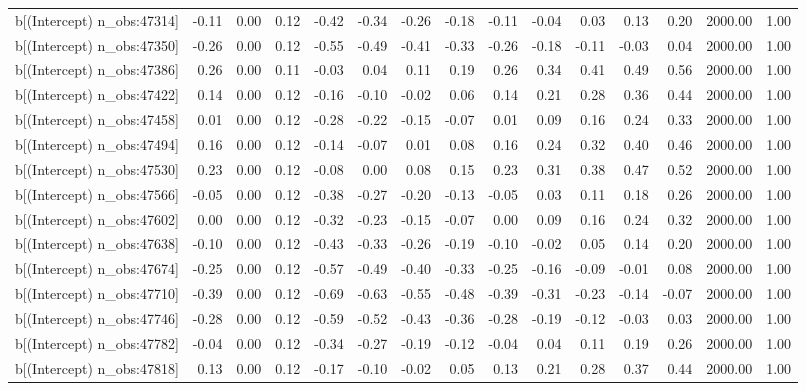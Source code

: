 \begin{table}[ht]
\begin{tabular}{rrrrrrrrrrrrrrr}
  b[(Intercept) n\_obs:47314] & -0.11 & 0.00 & 0.12 & -0.42 & -0.34 & -0.26 & -0.18 & -0.11 & -0.04 & 0.03 & 0.13 & 0.20 & 2000.00 & 1.00 \\ 
  b[(Intercept) n\_obs:47350] & -0.26 & 0.00 & 0.12 & -0.55 & -0.49 & -0.41 & -0.33 & -0.26 & -0.18 & -0.11 & -0.03 & 0.04 & 2000.00 & 1.00 \\ 
  b[(Intercept) n\_obs:47386] & 0.26 & 0.00 & 0.11 & -0.03 & 0.04 & 0.11 & 0.19 & 0.26 & 0.34 & 0.41 & 0.49 & 0.56 & 2000.00 & 1.00 \\ 
  b[(Intercept) n\_obs:47422] & 0.14 & 0.00 & 0.12 & -0.16 & -0.10 & -0.02 & 0.06 & 0.14 & 0.21 & 0.28 & 0.36 & 0.44 & 2000.00 & 1.00 \\ 
  b[(Intercept) n\_obs:47458] & 0.01 & 0.00 & 0.12 & -0.28 & -0.22 & -0.15 & -0.07 & 0.01 & 0.09 & 0.16 & 0.24 & 0.33 & 2000.00 & 1.00 \\ 
  b[(Intercept) n\_obs:47494] & 0.16 & 0.00 & 0.12 & -0.14 & -0.07 & 0.01 & 0.08 & 0.16 & 0.24 & 0.32 & 0.40 & 0.46 & 2000.00 & 1.00 \\ 
  b[(Intercept) n\_obs:47530] & 0.23 & 0.00 & 0.12 & -0.08 & 0.00 & 0.08 & 0.15 & 0.23 & 0.31 & 0.38 & 0.47 & 0.52 & 2000.00 & 1.00 \\ 
  b[(Intercept) n\_obs:47566] & -0.05 & 0.00 & 0.12 & -0.38 & -0.27 & -0.20 & -0.13 & -0.05 & 0.03 & 0.11 & 0.18 & 0.26 & 2000.00 & 1.00 \\ 
  b[(Intercept) n\_obs:47602] & 0.00 & 0.00 & 0.12 & -0.32 & -0.23 & -0.15 & -0.07 & 0.00 & 0.09 & 0.16 & 0.24 & 0.32 & 2000.00 & 1.00 \\ 
  b[(Intercept) n\_obs:47638] & -0.10 & 0.00 & 0.12 & -0.43 & -0.33 & -0.26 & -0.19 & -0.10 & -0.02 & 0.05 & 0.14 & 0.20 & 2000.00 & 1.00 \\ 
  b[(Intercept) n\_obs:47674] & -0.25 & 0.00 & 0.12 & -0.57 & -0.49 & -0.40 & -0.33 & -0.25 & -0.16 & -0.09 & -0.01 & 0.08 & 2000.00 & 1.00 \\ 
  b[(Intercept) n\_obs:47710] & -0.39 & 0.00 & 0.12 & -0.69 & -0.63 & -0.55 & -0.48 & -0.39 & -0.31 & -0.23 & -0.14 & -0.07 & 2000.00 & 1.00 \\ 
  b[(Intercept) n\_obs:47746] & -0.28 & 0.00 & 0.12 & -0.59 & -0.52 & -0.43 & -0.36 & -0.28 & -0.19 & -0.12 & -0.03 & 0.03 & 2000.00 & 1.00 \\ 
  b[(Intercept) n\_obs:47782] & -0.04 & 0.00 & 0.12 & -0.34 & -0.27 & -0.19 & -0.12 & -0.04 & 0.04 & 0.11 & 0.19 & 0.26 & 2000.00 & 1.00 \\ 
  b[(Intercept) n\_obs:47818] & 0.13 & 0.00 & 0.12 & -0.17 & -0.10 & -0.02 & 0.05 & 0.13 & 0.21 & 0.28 & 0.37 & 0.44 & 2000.00 & 1.00 \\ 

\end{tabular}
\end{table}
